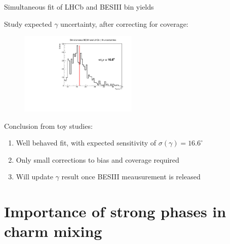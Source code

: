 \documentclass[xcolor={dvipsnames}]{beamer}
\begin{document}
\begin{frame}{Simultaneous fit of LHCb and BESIII bin yields}
  \begin{center}
    \large Study expected $\gamma$ uncertainty, after correcting for coverage:
  \end{center}
  \vspace{-0.3cm}
  \begin{figure}[htb]
    \centering
    \includegraphics[width=0.5\textwidth]{Plots/Gamma_SimultaneousFit_err.pdf}
  \end{figure}
  \vspace{-0.4cm}
  {\large Conclusion from toy studies:}
  \vspace{-0.0cm}
  \begin{enumerate}
    \item{Well behaved fit, with expected sensitivity of $\sigma(\gamma) = 16.6^\circ$}
    \item{Only small corrections to bias and coverage required}
    \item{Will update $\gamma$ result once BESIII meausurement is released}
  \end{enumerate}
\end{frame}

\section{Importance of strong phases in charm mixing}
\end{document}
